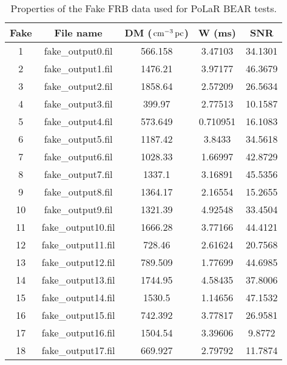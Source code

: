 \begin{sidewaystable}
    \centering
    \caption[Properties of fake FRB data]{Properties of the Fake FRB data used for PoLaR BEAR tests.}
    \begin{minipage}{0.5\textheight}
    \begin{tabular}{ccccc}
        \hline
          Fake  &   File name   &  DM ($\,\text{cm}^{-3}\,\text{pc}$)  &  W (ms)  &   SNR   \\
        \hline
           1       & fake\_output0.fil  &    566.158    & 3.47103  & 34.1301 \\
           2       & fake\_output1.fil  &    1476.21    & 3.97177  & 46.3679 \\
           3       & fake\_output2.fil  &    1858.64    & 2.57209  & 26.5634 \\
           4       & fake\_output3.fil  &    399.97     & 2.77513  & 10.1587 \\
           5       & fake\_output4.fil  &    573.649    & 0.710951 & 16.1083 \\
           6       & fake\_output5.fil  &    1187.42    &  3.8433  & 34.5618 \\
           7       & fake\_output6.fil  &    1028.33    & 1.66997  & 42.8729 \\
           8       & fake\_output7.fil  &    1337.1     & 3.16891  & 45.5356 \\
           9       & fake\_output8.fil  &    1364.17    & 2.16554  & 15.2655 \\
          10       & fake\_output9.fil  &    1321.39    & 4.92548  & 33.4504 \\
          11       & fake\_output10.fil &    1666.28    & 3.77166  & 44.4121 \\
          12       & fake\_output11.fil &    728.46     & 2.61624  & 20.7568 \\
          13       & fake\_output12.fil &    789.509    & 1.77699  & 44.6985 \\
          14       & fake\_output13.fil &    1744.95    & 4.58435  & 37.8006 \\
          15       & fake\_output14.fil &    1530.5     & 1.14656  & 47.1532 \\
          16       & fake\_output15.fil &    742.392    & 3.77817  & 26.9581 \\
          17       & fake\_output16.fil &    1504.54    & 3.39606  & 9.8772  \\
          18       & fake\_output17.fil &    669.927    & 2.79792  & 11.7874 \\

\end{tabular}
\end{minipage}
\end{sidewaystable}
